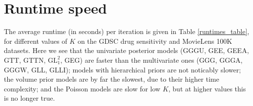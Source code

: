 \documentclass{article}
\begin{document}
		
	\section{Runtime speed}
		The average runtime (in seconds) per iteration is given in Table \ref{runtimes_table}, for different values of $K$ on the GDSC drug sensitivity and MovieLens 100K datasets. Here we see that the univariate posterior models (GGGU, GEE, GEEA, GTT, GTTN, $\text{GL}^2_1$, GEG) are faster than the multivariate ones (GGG, GGGA, GGGW, GLL, GLLI); models with hierarchical priors are not noticably slower; the volume prior models are by far the slowest, due to their higher time complexity; and the Poisson models are slow for low $K$, but at higher values this is no longer true.
		
\end{document}
